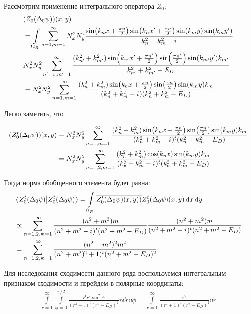 Рассмотрим применение интегрального оператора $Z_0$:
\begin{align*}
& (Z_0 (\Delta_0 \psi))(x, y) \\
&= \int\limits_{\Omega_R} \sum\limits_{n = 1, m = 1}^\infty N_x^2 N_y^2 \frac{\sin(k_n x + \frac{\pi n}{2}) \sin(k_n x' + \frac{\pi n}{2}) \sin(k_m y) \sin(k_m y')}{k^2_n + k^2_m - {i\mkern1mu}} \\
& N_x^2 N_y^2 \sum\limits_{n' = 1, m' = 1}^\infty \frac{(k_{n'}^2 + k_{m'}^2) \sin(k_{n'} x' + \frac{\pi n'}{2}) \sin(\frac{\pi n'}{2}) \sin(k_{m'} y') k_{m'}}{k_{n'}^2 + k_{m'}^2 - E_D} \\
&= N_x^2 N_y^2 \sum\limits_{n = 1, m = 1}^\infty \frac{(k_n^2 + k_m^2) \sin(k_n x + \frac{\pi n}{2}) \sin(\frac{\pi n}{2}) \sin(k_m y) k_m}{(k_n^2 + k_m^2 - {i\mkern1mu}) (k_n^2 + k_m^2 - E_D)}
\end{align*}

Легко заметить, что 

\begin{align*}
(Z_0^t (\Delta_0 \psi))(x, y)
&= N_x^2 N_y^2 \sum\limits_{n = 1, m = 1}^\infty \frac{(k_n^2 + k_m^2) \sin(k_n x + \frac{\pi n}{2}) \sin(\frac{\pi n}{2}) \sin(k_m y) k_m}{(k_n^2 + k_m^2 - {i\mkern1mu})^t (k_n^2 + k_m^2 - E_D)} \\
&= N_x^2 N_y^2 \sum\limits_{n = 1,2, m = 1}^\infty \frac{(k_n^2 + k_m^2) \cos(k_n x) \sin(k_m y) k_m}{(k_n^2 + k_m^2 - {i\mkern1mu})^t (k_n^2 + k_m^2 - E_D)}
\end{align*}

Тогда норма обобщенного элемента будет равна:
\begin{align*}
& \ip{Z_0^t (\Delta_0 \psi)}{Z_0^t (\Delta_0 \psi)} = \int\limits_{\Omega_R} \cconj{Z_0^t (\Delta_0 \psi)(x, y))} Z_0^t (\Delta_0 \psi)(x, y) \dd{x} \dd{y} \\
&\propto \sum\limits_{n = 1,2, m = 1}^\infty \frac{(n^2 + m^2) m}{\cconj{(n^2 + m^2 - \iu)^t (n^2 + m^2 - E_D)}} \frac{(n^2 + m^2) m}{(n^2 + m^2 - \iu)^t (n^2 + m^2 - E_D)} \\
&= \sum\limits_{n = 1,2, m = 1}^\infty \frac{(n^2 + m^2)^2 m^2}{(n^2 + m^2)^{2} + 1)^t (n^2 + m^2 - E_D)^2} 
\end{align*}

Для исследования сходимости данного ряда воспользуемся интегральным признаком сходимости и перейдем в полярные координаты:
\begin{align*}
\int\limits_{r = 1}^\infty \int\limits_{\phi = 0}^{\pi / 2} \frac{r^4 r^2 \sin^2 \phi}{(r^4 + 1)^t (r^2 - E_D)^2} r \dd{r} \dd{\phi}
= \int\limits_{r = 1}^\infty \frac{r^7}{(r^4 + 1)^t (r^2 - E_D)^2} \dd{r}
\end{align*}


